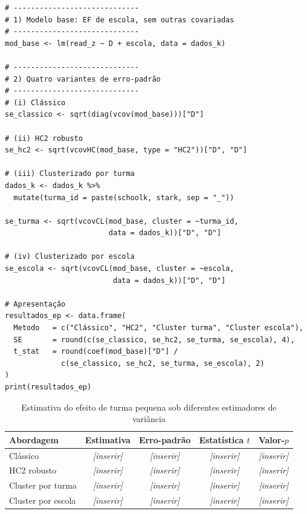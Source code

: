 \begin{lstlisting}[style=Rstyle, caption={Comparação de quatro estimadores de variância no STAR}]
# -----------------------------
# 1) Modelo base: EF de escola, sem outras covariadas
# -----------------------------
mod_base <- lm(read_z ~ D + escola, data = dados_k)

# -----------------------------
# 2) Quatro variantes de erro-padrão
# -----------------------------
# (i) Clássico
se_classico <- sqrt(diag(vcov(mod_base)))["D"]

# (ii) HC2 robusto
se_hc2 <- sqrt(vcovHC(mod_base, type = "HC2"))["D", "D"]

# (iii) Clusterizado por turma
dados_k <- dados_k %>%
  mutate(turma_id = paste(schoolk, stark, sep = "_"))

se_turma <- sqrt(vcovCL(mod_base, cluster = ~turma_id,
                        data = dados_k))["D", "D"]

# (iv) Clusterizado por escola
se_escola <- sqrt(vcovCL(mod_base, cluster = ~escola,
                         data = dados_k))["D", "D"]

# Apresentação
resultados_ep <- data.frame(
  Metodo   = c("Clássico", "HC2", "Cluster turma", "Cluster escola"),
  SE       = round(c(se_classico, se_hc2, se_turma, se_escola), 4),
  t_stat   = round(coef(mod_base)["D"] /
             c(se_classico, se_hc2, se_turma, se_escola), 2)
)
print(resultados_ep)
\end{lstlisting}

\begin{table}[H]
\centering
\caption{Estimativa do efeito de turma pequena sob diferentes estimadores de variância}
\label{tab:erros_padrao}
\begin{tabular}{lcccc}
\toprule
Abordagem & Estimativa & Erro-padrão & Estatística $t$ & Valor-$p$ \\
\midrule
Clássico              & \textit{[inserir]} & \textit{[inserir]} & \textit{[inserir]} & \textit{[inserir]} \\
HC2 robusto           & \textit{[inserir]} & \textit{[inserir]} & \textit{[inserir]} & \textit{[inserir]} \\
Cluster por turma     & \textit{[inserir]} & \textit{[inserir]} & \textit{[inserir]} & \textit{[inserir]} \\
Cluster por escola    & \textit{[inserir]} & \textit{[inserir]} & \textit{[inserir]} & \textit{[inserir]} \\
\bottomrule
\end{tabular}

\vspace{4pt}
\end{table}

